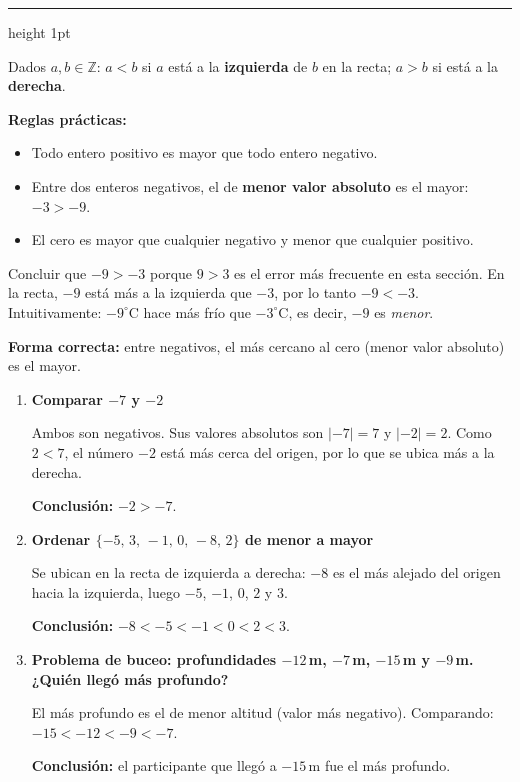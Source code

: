 \documentclass[11pt, letterpaper]{article}
\newcommand{\subbloque}[1]{%
  \vspace{14pt}
  \noindent{\large\bfseries\color{zenitnavy} #1}\par
  \vspace{4pt}\hrule height 1pt\vspace{8pt}}
\begin{document}
\subbloque{1.4 Orden y comparaci\'on de enteros}
\label{sub:1.4}

\begin{tcolorbox}[importantbox, title={Relaci\'on de orden en $\mathbb{Z}$}]
Dados $a,b\in\mathbb{Z}$: $a<b$ si $a$ est\'a a la \textbf{izquierda} de $b$ en la recta; $a>b$ si est\'a a la \textbf{derecha}.

\textbf{Reglas pr\'acticas:}
\begin{itemize}[itemsep=3pt]
  \item Todo entero positivo es mayor que todo entero negativo.
  \item Entre dos enteros negativos, el de \textbf{menor valor absoluto} es el mayor: $-3>-9$.
  \item El cero es mayor que cualquier negativo y menor que cualquier positivo.
\end{itemize}
\end{tcolorbox}

\begin{tcolorbox}[warningbox, title={Error frecuente --- comparar negativos por su valor absoluto}]
Concluir que $-9>-3$ porque $9>3$ es el error m\'as frecuente en esta secci\'on. En la recta, $-9$ est\'a m\'as a la izquierda que $-3$, por lo tanto $-9<-3$. Intuitivamente: $-9^\circ$C hace m\'as fr\'io que $-3^\circ$C, es decir, $-9$ es \emph{menor}.

\textbf{Forma correcta:} entre negativos, el m\'as cercano al cero (menor valor absoluto) es el mayor.
\end{tcolorbox}

\begin{tcolorbox}[examplebox, title={Ejemplos --- comparaci\'on y ordenamiento de enteros}]
\begin{enumerate}[label=\textbf{Ej. \arabic*.}, leftmargin=*, itemsep=12pt]

\item \textbf{Comparar $-7$ y $-2$}

Ambos son negativos. Sus valores absolutos son $|-7|=7$ y $|-2|=2$. Como $2<7$, el n\'umero $-2$ est\'a m\'as cerca del origen, por lo que se ubica m\'as a la derecha.

\textbf{Conclusi\'on:} $-2>-7$.

\item \textbf{Ordenar $\{-5,\,3,\,-1,\,0,\,-8,\,2\}$ de menor a mayor}

Se ubican en la recta de izquierda a derecha: $-8$ es el m\'as alejado del origen hacia la izquierda, luego $-5$, $-1$, $0$, $2$ y $3$.

\textbf{Conclusi\'on:} $-8<-5<-1<0<2<3$.

\item \textbf{Problema de buceo: profundidades $-12$\,m, $-7$\,m, $-15$\,m y $-9$\,m. ¿Qui\'en lleg\'o m\'as profundo?}

El m\'as profundo es el de menor altitud (valor m\'as negativo). Comparando: $-15<-12<-9<-7$.

\textbf{Conclusi\'on:} el participante que lleg\'o a $-15$\,m fue el m\'as profundo.

\end{enumerate}
\end{tcolorbox}
\end{document}
